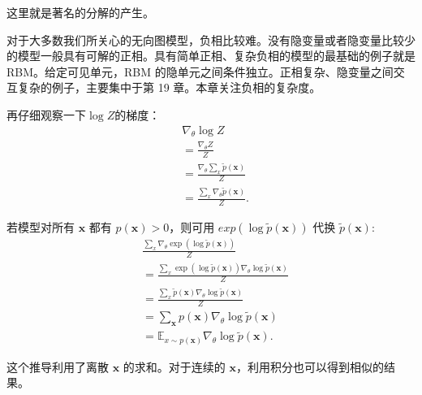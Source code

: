 这里就是著名的分解的产生。

对于大多数我们所关心的无向图模型，负相比较难。没有隐变量或者隐变量比较少的模型一般具有可解的正相。具有简单正相、复杂负相的模型的最基础的例子就是 RBM。给定可见单元，RBM 的隐单元之间条件独立。正相复杂、隐变量之间交互复杂的例子，主要集中于第 19 章。本章关注负相的复杂度。

再仔细观察一下\(\log Z\)的梯度：
\begin{align}
    & \nabla_\theta \log{Z}                                \\
    & = \frac{\nabla_\theta Z}{Z}                          \\
    & = \frac{\nabla_\theta\sum_x\widetilde{p}(\bm{x})}{Z} \\
    & = \frac{\sum_x\nabla_\theta\widetilde{p}(\bm{x})}{Z}.
\end{align}

若模型对所有 \(\bm{x}\) 都有 \(p(\bm{x})>0\)，则可用 \(exp(\log\widetilde{p}(\bm{x}))\) 代换 \(\widetilde{p}(\bm{x})\):
\begin{align}
& \frac{\sum_x\nabla_\theta\exp(
	\log{\widetilde{p}(\bm{x})})}{Z}             \\
& = \frac{\sum_x\exp(\log{\widetilde{p}(\bm{x})})
	\nabla_\theta\log{\widetilde{p}(\bm{x})}}{Z} \\
& = \frac{\sum_x\widetilde{p}(\bm{x})
	\nabla_\theta\log\widetilde{p}(\bm{x})}{Z}   \\
& = \sum_{\bm{x}}p(\bm{x})
	\nabla_\theta\log\widetilde{p}(\bm{x})       \\
& = \mathbb{E}_{x\sim{}p(\bm{x})}
	\nabla_\theta\log\widetilde{p}(\bm{x}).
\end{align}

这个推导利用了离散 \(\bm{x}\) 的求和。对于连续的 \(\bm{x}\)，利用积分也可以得到相似的结果。